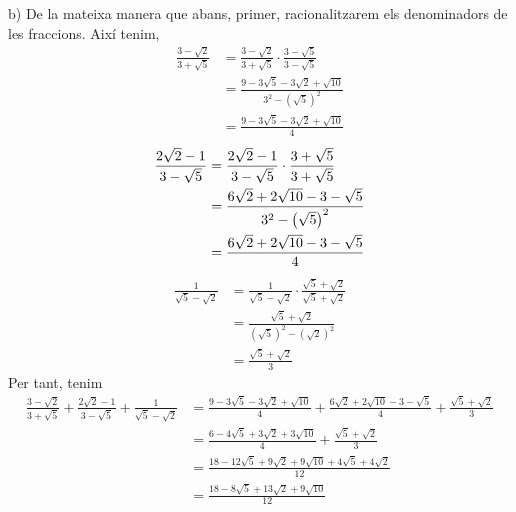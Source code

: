 \begin{solucio}
b) De la mateixa manera que abans, primer, racionalitzarem els denominadors de
les fraccions. Així tenim,%
\begin{align*}
\frac{3-\sqrt{2}}{3+\sqrt{5}} &=\frac{3-\sqrt{2}}{3+\sqrt{5}}\cdot \frac{3-%
\sqrt{5}}{3-\sqrt{5}} \\
&=\frac{9-3\sqrt{5}-3\sqrt{2}+\sqrt{10}}{3^{2}-\left( \sqrt{5}\right) ^{2}}
\\
&=\frac{9-3\sqrt{5}-3\sqrt{2}+\sqrt{10}}{4}
\end{align*}%
\begin{align*}
\frac{2\sqrt{2}-1}{3-\sqrt{5}} &=\frac{2\sqrt{2}-1}{3-\sqrt{5}}\cdot \frac{%
3+\sqrt{5}}{3+\sqrt{5}} \\
&=\frac{6\sqrt{2}+2\sqrt{10}-3-\sqrt{5}}{3^{2}-\left( \sqrt{5}\right) ^{2}}
\\
&=\frac{6\sqrt{2}+2\sqrt{10}-3-\sqrt{5}}{4}
\end{align*}%
\begin{align*}
\frac{1}{\sqrt{5}-\sqrt{2}} &=\frac{1}{\sqrt{5}-\sqrt{2}}\cdot \frac{\sqrt{5%
}+\sqrt{2}}{\sqrt{5}+\sqrt{2}} \\
&=\frac{\sqrt{5}+\sqrt{2}}{\left( \sqrt{5}\right) ^{2}-\left( \sqrt{2}%
\right) ^{2}} \\
&=\frac{\sqrt{5}+\sqrt{2}}{3}
\end{align*}%
Per tant, tenim%
\begin{align*}
\frac{3-\sqrt{2}}{3+\sqrt{5}}+\frac{2\sqrt{2}-1}{3-\sqrt{5}}+\frac{1}{\sqrt{5%
}-\sqrt{2}} &=\frac{9-3\sqrt{5}-3\sqrt{2}+\sqrt{10}}{4}+\frac{6\sqrt{2}+2%
\sqrt{10}-3-\sqrt{5}}{4}+\frac{\sqrt{5}+\sqrt{2}}{3} \\
&=\frac{6-4\sqrt{5}+3\sqrt{2}+3\sqrt{10}}{4}+\frac{\sqrt{5}+\sqrt{2}}{3} \\
&=\frac{18-12\sqrt{5}+9\sqrt{2}+9\sqrt{10}+4\sqrt{5}+4\sqrt{2}}{12} \\
&=\frac{18-8\sqrt{5}+13\sqrt{2}+9\sqrt{10}}{12}
\end{align*}
\end{solucio} 